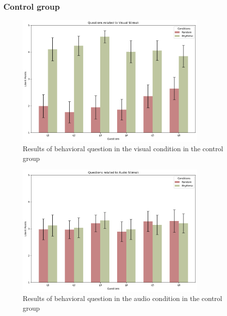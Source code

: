 \subsubsection*{Control group}
\begin{figure}[H]
    \centering
    \includegraphics[width=0.85\textwidth]{bar_plots/plotbar_visual_h.png}
    \caption{Results of behavioral question in the visual condition in the control group}
    \label{fig: bar_visual_control} 
\end{figure} 
\begin{figure}[H]
    \centering
    \includegraphics[width=0.85\textwidth]{bar_plots/plotbar_audio_h.png}
    \caption{Results of behavioral question in the audio condition in the control group}
    \label{fig: bar_audio_control} 
\end{figure} 
